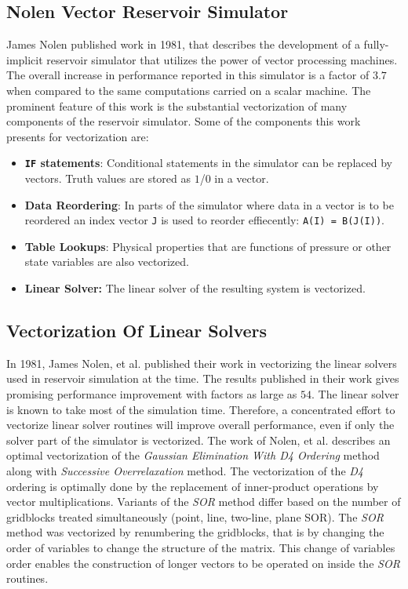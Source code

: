 \documentclass[barcolor=BrickRed,nocopyright,nolists]{asmejour}
\begin{document}
\subsection{Nolen Vector Reservoir Simulator}
James Nolen published work in 1981, that describes the development of a fully-implicit reservoir simulator that utilizes the power of vector processing machines\cite{spe9644}.
The overall increase in performance reported in this simulator is a factor of $3.7$ when compared to the same computations carried on a scalar machine. The prominent feature of this work is the substantial
vectorization of many components of the reservoir simulator. Some of the components this work presents for vectorization are:
\begin{itemize}
	\item \textbf{\texttt{IF} statements}: Conditional statements in the simulator can be replaced by vectors. Truth values are stored as $1$/$0$ in a vector.
	\item \textbf{Data Reordering}: In parts of the simulator where data in a vector is to be reordered an index vector \texttt{J} is used to reorder effiecently:
		\texttt{A(I) = B(J(I))}.
	\item \textbf{Table Lookups}: Physical properties that are functions of pressure or other state variables are also vectorized.
	\item \textbf{Linear Solver:} The linear solver of the resulting system is vectorized.
\end{itemize}


\subsection{Vectorization Of Linear Solvers}
In 1981, James Nolen, et al.\cite{spe7675} published their work in vectorizing the linear solvers used in reservoir simulation at the time.
The results published in their work gives promising performance improvement with factors as large as $54$.
The linear solver is known to take most of the simulation time. Therefore, a concentrated effort to vectorize linear solver routines will
improve overall performance, even if only the solver part of the simulator is vectorized. The work of Nolen, et al. describes an optimal vectorization of the \textit{Gaussian Elimination With D4 Ordering} method along with \textit{Successive Overrelaxation} method.
The vectorization of the \textit{D4} ordering is optimally done by the replacement of inner-product operations by vector multiplications.
Variants of the \textit{SOR} method differ based on the number of gridblocks treated simultaneously (point, line, two-line, plane SOR).
The \textit{SOR} method was vectorized by renumbering the gridblocks, that is by changing the order of variables to change the structure of the matrix.
This change of variables order enables the construction of longer vectors to be operated on inside the \textit{SOR} routines.
\end{document}
